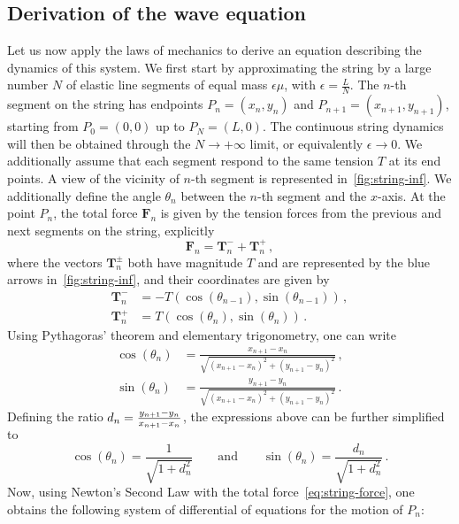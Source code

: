 \subsection{Derivation of the wave equation}
Let us now apply the laws of mechanics to derive an equation describing the dynamics of
this system. We first start by approximating the string by a large number $N$ of elastic
line segments of equal mass $\epsilon\mu$, with $\epsilon=\frac{L}{N}$. The $n$-th segment
on the string has endpoints $P_n=(x_n,y_n)$ and $P_{n+1}=(x_{n+1},y_{n+1})$, starting from
$P_0=(0,0)$ up to $P_N=(L,0)$. The continuous string dynamics will then be obtained
through the $N\to+\infty$ limit, or equivalently $\epsilon\to 0$. We additionally assume
that each segment respond to the same tension $T$ at its end points. A view of the
vicinity of $n$-th segment is represented in~\cref{fig:string-inf}. We additionally define
the angle $\theta_n$ between the $n$-th segment and the $x$-axis. At the point $P_n$, the
total force $\mathbf{F}_n$ is given by the tension forces from the previous and next
segments on the string, explicitly
\begin{equation}
  \mathbf{F}_n=\mathbf{T}_n^-+\mathbf{T}_n^+\,,\label{eq:string-force}
\end{equation}
where the vectors $\mathbf{T}_n^\pm$ both have magnitude $T$ and are represented by the
blue arrows in~\cref{fig:string-inf}, and their coordinates are given by
\begin{align}
  \mathbf{T}_n^-&=-T(\cos(\theta_{n-1}),\sin(\theta_{n-1}))\,,\\
  \mathbf{T}_n^+&=T(\cos(\theta_{n}),\sin(\theta_{n}))\,.
\end{align}
Using Pythagoras' theorem and elementary trigonometry, one can write
\begin{align}
  \cos(\theta_n)&=\frac{x_{n+1}-x_n}{\sqrt{(x_{n+1}-x_n)^2+(y_{n+1}-y_n)^2}}\,,\\
  \sin(\theta_n)&=\frac{y_{n+1}-y_n}{\sqrt{(x_{n+1}-x_n)^2+(y_{n+1}-y_n)^2}}\,.
\end{align}
Defining the ratio $d_n=\smash{\frac{y_{n+1}-y_n}{x_{n+1}-x_n}}$, the expressions above
can be further simplified to
\begin{equation}
  \cos(\theta_n)=\frac{1}{\sqrt{1+d_n^2}}\qquad\text{and}\qquad
  \sin(\theta_n)=\frac{d_n}{\sqrt{1+d_n^2}}\,.
\end{equation}
Now, using Newton's Second Law with the total force~\cref{eq:string-force}, one obtains
the following system of differential of equations for the motion of $P_n$:

